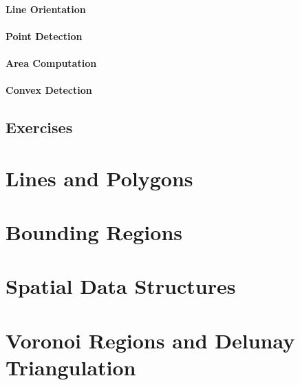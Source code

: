\documentclass[12pt]{report}
\begin{document}
	\subsubsection{Line Orientation}
	\subsubsection{Point Detection}
	\subsubsection{Area Computation}
	\subsubsection{Convex Detection}
\section{Exercises}

\chapter{Lines and Polygons}
\chapter{Bounding Regions}
\chapter{Spatial Data Structures}
\chapter{Voronoi Regions and Delunay Triangulation}
\end{document}
